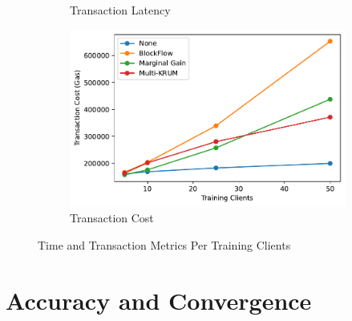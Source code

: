 \begin{figure}[!hb]
\begin{subfigure}[b]{0.49\textwidth}
        \caption{Transaction Latency}
    \end{subfigure}
    \hfill
    \begin{subfigure}[b]{0.49\textwidth}
        \centering
        \includegraphics[width=\textwidth]{graphics/clients/tx_cost.pdf}
        \caption{Transaction Cost}
    \end{subfigure}
    \caption{Time and Transaction Metrics Per Training Clients}
    \label{fig:clients_metrics}
\end{figure}

\section{Accuracy and Convergence}

